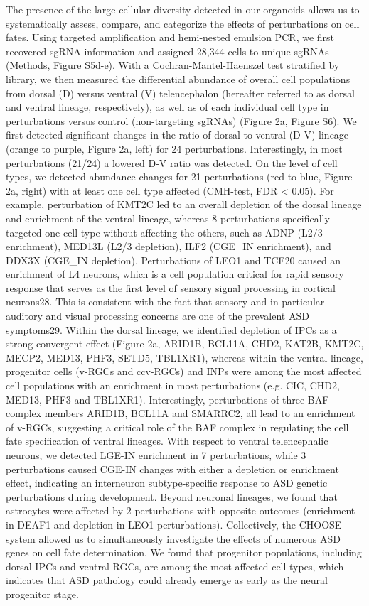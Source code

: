 The presence of the large cellular diversity detected in our organoids allows us to systematically assess, compare, and categorize the effects of perturbations on cell fates. Using targeted amplification and hemi-nested emulsion PCR, we first recovered sgRNA information and assigned 28,344 cells to unique sgRNAs (Methods, Figure S5d-e). With a Cochran-Mantel-Haenszel test stratified by library, we then measured the differential abundance of overall cell populations from dorsal (D) versus ventral (V) telencephalon (hereafter referred to as dorsal and ventral lineage, respectively), as well as of each individual cell type in perturbations versus control (non-targeting sgRNAs) (Figure 2a, Figure S6). 
We first detected significant changes in the ratio of dorsal to ventral (D-V) lineage (orange to purple, Figure 2a, left) for 24 perturbations. Interestingly, in most perturbations (21/24) a lowered D-V ratio was detected. On the level of cell types, we detected abundance changes for 21 perturbations (red to blue, Figure 2a, right) with at least one cell type affected (CMH-test, FDR < 0.05). For example, perturbation of KMT2C led to an overall depletion of the dorsal lineage and enrichment of the ventral lineage, whereas 8 perturbations specifically targeted one cell type without affecting the others, such as ADNP (L2/3 enrichment), MED13L (L2/3 depletion), ILF2 (CGE\_IN enrichment), and DDX3X (CGE\_IN depletion). Perturbations of LEO1 and TCF20 caused an enrichment of L4 neurons, which is a cell population critical for rapid sensory response that serves as the first level of sensory signal processing in cortical neurons28. This is consistent with the fact that sensory and in particular auditory and visual processing concerns are one of the prevalent ASD symptoms29. 
Within the dorsal lineage, we identified depletion of IPCs as a strong convergent effect (Figure 2a, ARID1B, BCL11A, CHD2, KAT2B, KMT2C, MECP2, MED13, PHF3, SETD5, TBL1XR1), whereas within the ventral lineage, progenitor cells (v-RGCs and ccv-RGCs) and INPs were among the most affected cell populations with an enrichment in most perturbations (e.g. CIC, CHD2, MED13, PHF3 and TBL1XR1). Interestingly, perturbations of three BAF complex members ARID1B, BCL11A and SMARRC2, all lead to an enrichment of v-RGCs, suggesting a critical role of the BAF complex in regulating the cell fate specification of ventral lineages. With respect to ventral telencephalic neurons, we detected LGE-IN enrichment in 7 perturbations, while 3 perturbations caused CGE-IN changes with either a depletion or enrichment effect, indicating an interneuron subtype-specific response to ASD genetic perturbations during development. Beyond neuronal lineages, we found that astrocytes were affected by 2 perturbations with opposite outcomes (enrichment in DEAF1 and depletion in LEO1 perturbations). 
Collectively, the CHOOSE system allowed us to simultaneously investigate the effects of numerous ASD genes on cell fate determination. We found that progenitor populations, including dorsal IPCs and ventral RGCs, are among the most affected cell types, which indicates that ASD pathology could already emerge as early as the neural progenitor stage.  

